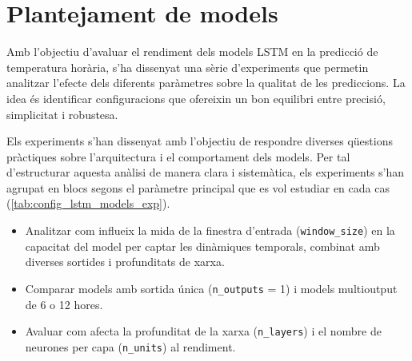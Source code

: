 \documentclass[../main.tex]{subfiles}
\begin{document}
\begin{itemize}
\end{itemize}


\section{Plantejament de models}

Amb l’objectiu d’avaluar el rendiment dels models LSTM en la predicció de temperatura horària, s’ha dissenyat una sèrie d’experiments que permetin analitzar l’efecte dels diferents paràmetres sobre la qualitat de les prediccions. La idea és identificar configuracions que ofereixin un bon equilibri entre precisió, simplicitat i robustesa.

Els experiments s’han dissenyat amb l’objectiu de respondre diverses qüestions pràctiques sobre l’arquitectura i el comportament dels models. Per tal d’estructurar aquesta anàlisi de manera clara i sistemàtica, els experiments s’han agrupat en blocs segons el paràmetre principal que es vol estudiar en cada cas (\cref{tab:config_lstm_models_exp}).

\begin{itemize}
    \item Analitzar com influeix la mida de la finestra d’entrada (\texttt{window\_size}) en la capacitat del model per captar les dinàmiques temporals, combinat amb diverses sortides i profunditats de xarxa.

    \item Comparar models amb sortida única (\texttt{n\_outputs} = 1) i models multioutput de 6 o 12 hores.

    \item Avaluar com afecta la profunditat de la xarxa (\texttt{n\_layers}) i el nombre de neurones per capa (\texttt{n\_units}) al rendiment. 
\end{itemize}
\end{document}
